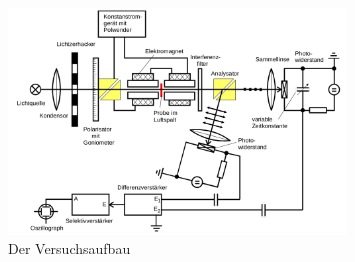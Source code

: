 \begin{figure}
	\centering
	\includegraphics[width=0.8\textwidth]{./Bilder/aufbau.png}
	\caption{Der Versuchsaufbau \cite{man}}\label{fig:aufbau}
\end{figure}

